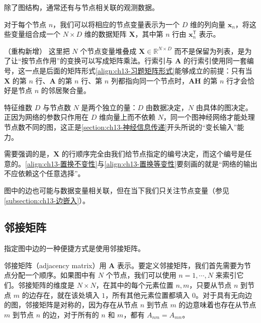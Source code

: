 \documentclass[../../main.tex]{subfiles}
\begin{document}
除了图结构，通常还有与节点相关联的观测数据。

\begin{definition}[节点变量与数据矩阵]\label{definition:ch13-节点数据矩阵}
对于每个节点 $n$，我们可以将相应的节点变量表示为一个 $D$ 维的列向量 $\bm{x}_n$，将这些变量组合成一个 $N\times D$ 维的数据矩阵 $\bm{X}$，其中第 $n$ 行由 $\bm{x}_n^{\mathsf T}$ 表示。
\end{definition}

\begin{remark}（重构新增）
这里把 $N$ 个节点变量堆叠成 $\bm{X}\in\mathbb{R}^{N\times D}$ 而不是保留为列表，是为了让“按节点作用”的变换可以写成矩阵乘法。行索引与 $\bm{A}$ 的行索引使用同一套编号，这一点是后面的矩阵形式\eqref{align:ch13-习题矩阵形式}能够成立的前提：只有当 $\bm{X}$ 的第 $n$ 行、$\bm{A}$ 的第 $n$ 行、第 $n$ 列都指向同一个节点时，$\bm{A}\bm{H}$ 的第 $n$ 行才会恰好是节点 $n$ 的邻居聚合量。\par
特征维数 $D$ 与节点数 $N$ 是两个独立的量：$D$ 由数据决定，$N$ 由具体的图决定。正因为网络的参数只作用在 $D$ 维向量上而不依赖 $N$，同一个图神经网络才能处理节点数不同的图，这正是\cref{section:ch13-神经信息传递}开头所说的“变长输入”能力。\par
需要强调的是，$\bm{X}$ 的行顺序完全由我们给节点指定的编号决定，而这个编号是任意的。\eqref{align:ch13-置换不变性}与\eqref{align:ch13-置换等变性}要刻画的就是“网络的输出不应依赖这个任意选择”。
\end{remark}

图中的边也可能与数据变量相关联，但在当下我们只关注节点变量（参见\cref{subsection:ch13-边嵌入}）。

\subsection{邻接矩阵}\label{subsection:ch13-邻接矩阵}

指定图中边的一种便捷方式是使用邻接矩阵。

\begin{definition}[邻接矩阵]\label{definition:ch13-邻接矩阵}
邻接矩阵（adjacency matrix）用 $\bm{A}$ 表示。要定义邻接矩阵，我们首先需要为节点分配一个顺序。如果图中有 $N$ 个节点，我们可以使用 $n=1,\cdots,N$ 来索引它们。邻接矩阵的维度是 $N\times N$，在其中的每个元素位置 $n,m$，只要从节点 $n$ 到节点 $m$ 的边存在，就在该处填入 $1$，所有其他元素位置都填入 $0$。对于具有无向边的图，邻接矩阵是对称的，因为存在从节点 $n$ 到节点 $m$ 的边意味着也存在从节点 $m$ 到节点 $n$ 的边，对于所有的 $n$ 和 $m$，都有 $A_{nm}=A_{mn}$。
\end{definition}
\end{document}
